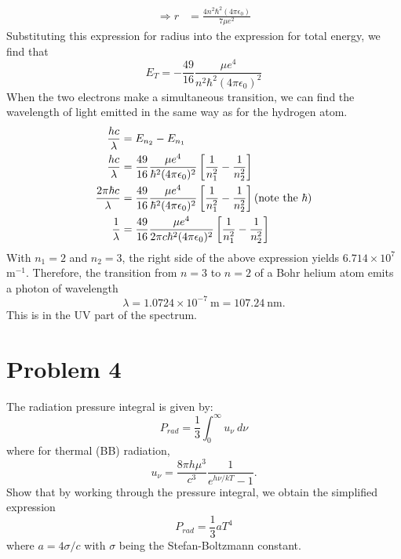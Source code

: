 \documentclass[12pt]{article}
\begin{document}
\begin{adjustwidth}{2.5em}{0pt}
\begin{siderules}
{\begin{equation}
\begin{aligned}
\Rightarrow r &= \frac{4n^2\hbar^2(4\pi \epsilon_0)}{7\mu e^2}
\end{aligned}
\end{equation}
Substituting this expression for radius into the expression for total energy, we find that
\begin{equation}
E_T = -\frac{49}{16}\frac{\mu e^4}{n^2\hbar^2(4\pi\epsilon_0)^2}
\end{equation}
When the two electrons make a simultaneous transition, we can find the wavelength of light emitted in the same way as for the hydrogen atom.
\begin{equation}
\begin{aligned}
\frac{hc}{\lambda} &= E_{n_2} - E_{n_1} \\
\frac{hc}{\lambda} &= \frac{49}{16}\frac{\mu e^4}{\hbar^2(4\pi\epsilon_0)^2}\left[ \frac{1}{n_1^2} - \frac{1}{n_2^2} \right] \\
\frac{2\pi \hbar c}{\lambda} &= \frac{49}{16}\frac{\mu e^4}{\hbar^2(4\pi\epsilon_0)^2}\left[ \frac{1}{n_1^2} - \frac{1}{n_2^2} \right] \hfill (\text{note the } \hbar) \\
\frac{1}{\lambda} &= \frac{49}{16}\frac{\mu e^4}{2\pi c \hbar^2(4\pi\epsilon_0)^2}\left[ \frac{1}{n_1^2} - \frac{1}{n_2^2} \right]
\end{aligned}
\end{equation}
With $n_1 = 2$ and $n_2 = 3$, the right side of the above expression yields $6.714 \times 10^7$ m$^{-1}$. Therefore, the transition from $n = 3$ to $n = 2$ of a Bohr helium atom emits a photon of wavelength
\begin{equation}
\lambda = 1.0724 \times 10^{-7} ~\text{m} = 107.24 ~\text{nm}.
\end{equation}
This is in the UV part of the spectrum.
 }
\end{siderules}
\end{adjustwidth}

\section*{Problem 4}
The radiation pressure integral is given by:
\begin{equation*}
P_{rad} = \frac{1}{3} \int_{0}^{\infty} u_{\nu} ~d\nu
\end{equation*}
where for thermal (BB) radiation,
\begin{equation*}
u_{\nu} = \frac{8\pi h\mu^3}{c^3}\frac{1}{e^{h\nu /kT}-1}.
\end{equation*}
Show that by working through the pressure integral, we obtain the simplified expression 
\begin{equation*}
P_{rad} = \frac{1}{3}aT^4
\end{equation*}
where $a = 4\sigma/c$ with $\sigma$ being the Stefan-Boltzmann constant.
\end{document}
